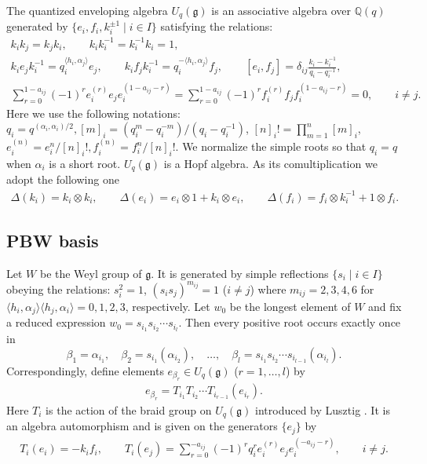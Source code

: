 \documentclass[pdftex]{sigma}
\newcommand{\geh}{\mathfrak{g}}
\newcommand{\ot}{\otimes}
\newcommand{\pair}[1]{\langle{#1}\rangle}
\newcommand{\Q}{{\mathbb Q}}
\begin{document}
The quantized enveloping algebra $U_q(\geh)$ is an associative algebra over $\Q(q)$ generated by
$\{e_i, f_i, k_i^{\pm1} \mid i\in I\}$ satisfying the relations:
\begin{gather}
 k_i k_j=k_j k_i, \qquad
k_i k_i^{-1}=k_i^{-1}k_i=1, \nonumber
\\
 k_i e_j k_i^{-1}=q_i^{\langle h_i,\alpha_j \rangle} e_j, \qquad
k_i f_j k_i^{-1}=q_i^{-\langle h_i, \alpha_j \rangle} f_j, \qquad
[e_i, f_j]=\delta_{ij}\frac{k_i-k_i^{-1}}{q_i-q_i^{-1}}, \nonumber
\\
 \sum_{r=0}^{1-a_{ij}} (-1)^r e_i^{(r)} e_j e_i^{(1-a_{ij}-r)}
=\sum_{r=0}^{1-a_{ij}} (-1)^r f_i^{(r)} f_j f_i^{(1-a_{ij}-r)}=0,\qquad i\neq j.\label{a:serre}
\end{gather}
Here we use the following notations:
$q_i=q^{(\alpha_i,\alpha_i)/2},[m]_i=(q_i^m-q_i^{-m})/(q_i-q_i^{-1})$,
$[n]_i!=\prod\limits_{m=1}^n[m]_i$, $e_i^{(n)}=e_i^n/[n]_i!,f_i^{(n)}=f_i^n/[n]_i!$.
We normalize the simple roots so that $q_i=q$ when
$\alpha_i$ is a short root.
$U_q(\geh)$ is a Hopf algebra. As its comultiplication we adopt the following one
\begin{gather*}
\Delta(k_i)=k_i\ot k_i,\qquad \Delta(e_i)=e_i\ot1+k_i\ot e_i,\qquad \Delta(f_i)=f_i\ot k_i^{-1}+1\ot f_i.
\end{gather*}

\subsection{PBW basis}\label{a:ss:pbw}

Let $W$ be the Weyl group of $\geh$. It is generated by simple ref\/lections $\{s_i\mid i\in I\}$
obeying the relations: $s_i^2=1$, $(s_is_j)^{m_{ij}}=1$ ($i\ne j$) where $m_{ij}=2,3,4,6$ for
$\pair{h_i,\alpha_j}\pair{h_j,\alpha_i}=0,1,2,3$, respectively. Let $w_0$ be the longest element
of $W$ and f\/ix a reduced expression $w_0=s_{i_1}s_{i_2}\cdots s_{i_l}$. Then every positive root
occurs exactly once in
\[
\beta_1=\alpha_{i_1},\quad \beta_2=s_{i_1}(\alpha_{i_2}), \quad \ldots,\quad
\beta_l=s_{i_1}s_{i_2}\cdots s_{i_{l-1}}(\alpha_{i_l}).
\]
Correspondingly, def\/ine elements $e_{\beta_r}\in U_q(\geh)$ ($r=1,\ldots,l$) by
\begin{gather}\label{a:ebdef}
e_{\beta_r}=T_{i_1}T_{i_2}\cdots T_{i_{r-1}}(e_{i_r}).
\end{gather}
Here $T_i$ is the action of the braid group on $U_q(\geh)$ introduced by Lusztig \cite{L2}. It is
an algebra automorphism and is given on the generators $\{e_j\}$ by
\begin{gather*}
T_i(e_i) = -k_if_i,
\qquad
T_i(e_j)=\sum_{r=0}^{-a_{ij}}(-1)^r q_i^r e_i^{(r)}e_je_i^{(-a_{ij}-r)},
\qquad i\neq j.
\end{gather*}
\end{document}
